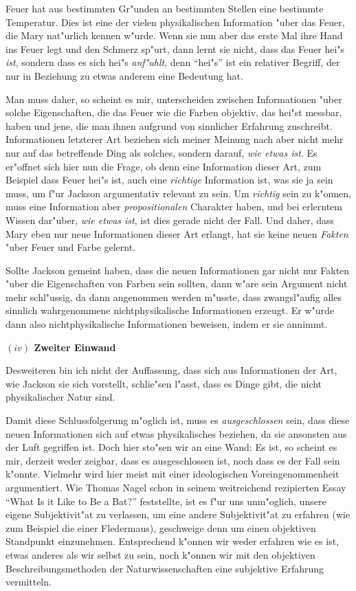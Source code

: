 \documentclass[a4paper, emulatestandardclasses, 12pt]{scrartcl}
\begin{document}
\begin{onehalfspace}
Feuer hat aus bestimmten Gr"unden an bestimmten Stellen eine bestimmte Temperatur. Dies ist eine der vielen physikalischen Information "uber das Feuer, die Mary nat"urlich kennen w"urde. Wenn sie nun aber das erste Mal ihre Hand ins Feuer legt und den Schmerz sp"urt, dann lernt sie nicht, dass das Feuer hei"s \emph{ist}, sondern dass es sich hei"s \emph{anf"uhlt}, denn "`hei"s"' ist ein relativer Begriff, der nur in Beziehung zu etwas anderem eine Bedeutung hat.

Man muss daher, so scheint es mir, unterscheiden zwischen Informationen "uber solche Eigenschaften, die das Feuer wie die Farben objektiv, das hei"st messbar, haben und jene, die man ihnen aufgrund von sinnlicher Erfahrung zuschreibt. Informationen letzterer Art beziehen sich meiner Meinung nach aber nicht mehr nur auf das betreffende Ding als solches, sondern darauf, \emph{wie etwas ist}. Es er"offnet sich hier nun die Frage, ob denn eine Information dieser Art, zum Beispiel dass Feuer hei"s ist, auch eine \emph{richtige} Information ist, was sie ja sein muss, um f"ur Jackson argumentativ relevant zu sein. Um \emph{richtig} sein zu k"onnen, muss eine Information aber \emph{propositionalen} Charakter haben, und bei erlerntem Wissen dar"uber, \emph{wie etwas ist}, ist dies gerade nicht der Fall. Und daher, dass Mary eben nur neue Informationen dieser Art erlangt, hat sie keine neuen \emph{Fakten} "uber Feuer und Farbe gelernt. 

Sollte Jackson gemeint haben, dass die neuen Informationen gar nicht nur Fakten "uber die Eigenschaften von Farben sein sollten, dann w"are sein Argument nicht mehr schl"ussig, da dann angenommen werden m"usste, dass zwangsl"aufig alles sinnlich wahrgenommene nichtphysikalische Informationen erzeugt. Er w"urde dann also nichtphysikalische Informationen beweisen, indem er sie annimmt.

\vspace{5mm}
\noindent\textbf{$(iv)$ Zweiter Einwand}

\noindent Desweiteren bin ich nicht der Auffassung, dass sich aus Informationen der Art, wie Jackson sie sich vorstellt, schlie"sen l"asst, dass es Dinge gibt, die nicht physikalischer Natur sind.

Damit diese Schlussfolgerung m"oglich ist, muss es \emph{ausgeschlossen} sein, dass diese neuen Informationen sich auf etwas physikalisches beziehen, da sie ansonsten aus der Luft gegriffen ist. Doch hier sto"sen wir an eine Wand: Es ist, so scheint es mir, derzeit weder zeigbar, dass es ausgeschlossen ist, noch dass es der Fall sein k"onnte. Vielmehr wird hier meist mit einer ideologischen Voreingenommenheit argumentiert. Wie Thomas Nagel schon in seinem weitreichend rezipierten Essay "`What Is it Like to Be a Bat?"' \citep{nagel1974like} feststellte, ist es f"ur uns unm"oglich, unsere eigene Subjektivit"at zu verlassen, um eine andere Subjektivit"at zu erfahren (wie zum Beispiel die einer Fledermaus), geschweige denn um einen objektiven Standpunkt einzunehmen. Entsprechend k"onnen wir weder erfahren wie es ist, etwas anderes als wir selbst zu sein, noch k"onnen wir mit den objektiven Beschreibungsmethoden der Naturwissenschaften eine subjektive Erfahrung vermitteln. 


\end{onehalfspace}
\end{document}
